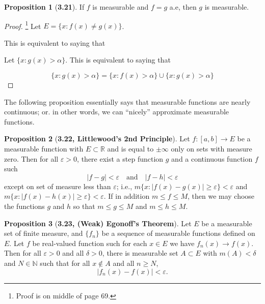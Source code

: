 \documentclass[12pt]{article}
\newcommand{\R}{\mathbb{R}}
\newcommand{\N}{\mathbb{N}}
\renewcommand{\epsilon}{\varepsilon}
\theoremstyle{definition}
\newtheorem*{prop}{Proposition}
\begin{document}
\begin{prop}[\textbf{3.21}] If \( f \) is measurable and \( f =  g\) a.e, then \( g \) is measurable.

        \begin{proof}\footnote{Proof is on middle of page 69.}
            Let \( E = \{ x: f(x) \neq g(x) \} \). 
            
            This is equivalent to saying that     

            Let \( \{ x: g(x) > \alpha \} \). This is equivalent to saying that     

                \[
                    \{ x: g(x) > \alpha \} = \{ x: f(x) > \alpha \} \cup \{ x: g(x) > \alpha \}
                \]
        \end{proof}
    
\end{prop}


The following proposition essentially says that measurable functions are nearly continuous; or. in other words, we can ``nicely'' approximate measurable functions. 

\begin{prop}[\textbf{3.22, Littlewood's 2nd Principle}]


    Let \( f: [a,b] \to E \) be a measurable function with \( E \subset \R \) and is equal to \( \pm \infty \) only on sets with measure zero. Then for all \( \epsilon > 0 \), there exist a step function \( g \) and a continuous function \( f \) such 
        \[
            |f - g| < \epsilon \quad \text{and} \quad |f - h| < \epsilon  
        \]
    except on set of measure less than \( \epsilon \); i.e., \( m\{x: |f(x) - g(x)| \geq \epsilon\} <  \epsilon \) and \( m\{x: |f(x) - h(x)| \geq \epsilon\} <  \epsilon \). If in addition \( m \leq f \leq M \), then we may choose the functions \( g \) and \( h \) so that \( m \leq g \leq M\) and \( m \leq h \leq M \).
 
\end{prop}


\begin{prop}[\textbf{3.23, (Weak) Egonoff's Theorem}]

    Let \( E \) be a measurable set of finite measure, and \( \{ f_n \} \) be a sequence of measurable functions defined on \( E \). Let \( f \) be real-valued function such for each \( x \in E \) we have \( f_n(x) \to f(x) \). Then for all \( \epsilon > 0 \) and all \( \delta > 0 \), there is measurable set \( A \subset E \) with \( m(A) < \delta \) and \( N \in \N \) such that for all \( x \not\in A \) and all \( n \geq N\),
        \[
            |f_n(x) - f(x)| < \epsilon.    
        \]
    
\end{prop}
\end{document}
